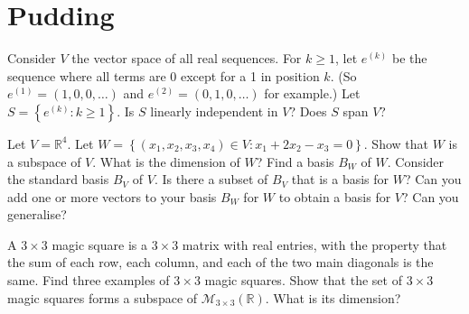 \documentclass[answers]{exam}
\begin{document}
\section*{Pudding}
\begin{questions}

\question%
Consider $V$ the vector space of all real sequences. For $k \geqslant 1$, let $e^{(k)}$ be the sequence where all terms are 0 except for a 1 in position $k$. (So $e^{(1)}=(1,0,0, \ldots)$ and $e^{(2)}=(0,1,0, \ldots)$ for example.) Let $S=\left\{e^{(k)}: k \geqslant 1\right\}$. Is $S$ linearly independent in $V$? Does $S$ span $V$?



\question%
Let $V=\mathbb{R}^{4}$. Let $W=\left\{\left(x_{1}, x_{2}, x_{3}, x_{4}\right) \in V: x_{1}+2 x_{2}-x_{3}=0\right\}$. Show that $W$ is a subspace of $V$. What is the dimension of $W$? Find a basis $B_{W}$ of $W$. Consider the standard basis $B_{V}$ of $V$. Is there a subset of $B_{V}$ that is a basis for $W$? Can you add one or more vectors to your basis $B_{W}$ for $W$ to obtain a basis for $V$? Can you generalise?



\question%
A $3 \times 3$ magic square is a $3 \times 3$ matrix with real entries, with the property that the sum of each row, each column, and each of the two main diagonals is the same. Find three examples of $3 \times 3$ magic squares. Show that the set of $3 \times 3$ magic squares forms a subspace of $\mathcal{M}_{3 \times 3}(\mathbb{R})$. What is its dimension?

\end{questions}
\end{document}

